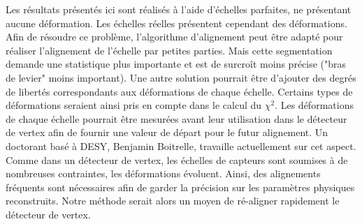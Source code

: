   \medskip
  
  Les r\'esultats pr\'esent\'es ici sont r\'ealis\'es \`a l'aide d'\'echelles parfaites, ne pr\'esentant aucune d\'eformation. Les \'echelles r\'eelles pr\'esentent cependant des d\'eformations. Afin de r\'esoudre ce probl\`eme, l'algorithme d'alignement peut \^etre adapt\'e pour r\'ealiser l'alignement de l'\'echelle par petites parties. Mais cette segmentation demande une statistique plus importante et est de surcro\^it moins pr\'ecise ("bras de levier" moins important). Une autre solution pourrait \^etre d'ajouter des degr\'es de libert\'es correspondants aux d\'eformations de chaque \'echelle. Certains types de d\'eformations seraient ainsi pris en compte dans le calcul du $\chi^2$. Les d\'eformations de chaque \'echelle pourrait \^etre mesur\'ees avant leur utilisation dans le d\'etecteur de vertex afin de fournir une valeur de d\'epart pour le futur alignement. Un doctorant bas\'e \`a DESY, Benjamin Boitrelle, travaille actuellement sur cet aspect. Comme dans un d\'etecteur de vertex, les \'echelles de capteurs sont soumises \`a de nombreuses contraintes, les d\'eformations \'evoluent. Ainsi, des alignements fr\'equents sont n\'ecessaires afin de garder la pr\'ecision sur les param\`etres physiques reconstruits. Notre m\'ethode serait alors un moyen de r\'e-aligner rapidement le d\'etecteur de vertex.
  
  \medskip
  
